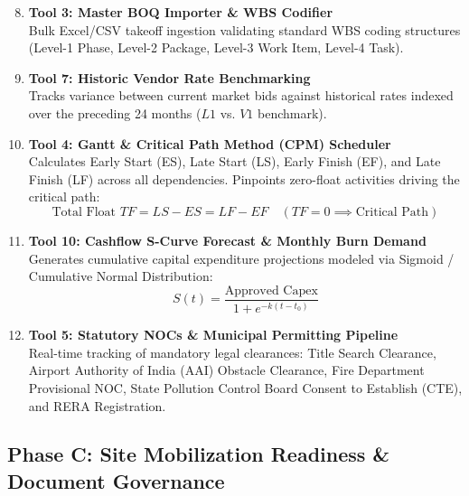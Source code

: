 \documentclass[11pt,a4paper]{article}
\begin{document}
\begin{enumerate}[leftmargin=*]
    \setcounter{enumi}{7}
    \item \textbf{Tool 3: Master BOQ Importer \& WBS Codifier} \\
    Bulk Excel/CSV takeoff ingestion validating standard WBS coding structures (Level-1 Phase, Level-2 Package, Level-3 Work Item, Level-4 Task).

    \item \textbf{Tool 7: Historic Vendor Rate Benchmarking} \\
    Tracks variance between current market bids against historical rates indexed over the preceding 24 months ($L1$ vs. $V1$ benchmark).

    \item \textbf{Tool 4: Gantt \& Critical Path Method (CPM) Scheduler} \\
    Calculates Early Start (ES), Late Start (LS), Early Finish (EF), and Late Finish (LF) across all dependencies. Pinpoints zero-float activities driving the critical path:
    \begin{equation}
        \text{Total Float } TF = LS - ES = LF - EF \quad (TF = 0 \implies \text{Critical Path})
    \end{equation}

    \item \textbf{Tool 10: Cashflow S-Curve Forecast \& Monthly Burn Demand} \\
    Generates cumulative capital expenditure projections modeled via Sigmoid / Cumulative Normal Distribution:
    \begin{equation}
        S(t) = \frac{\text{Approved Capex}}{1 + e^{-k(t - t_0)}}
    \end{equation}

    \item \textbf{Tool 5: Statutory NOCs \& Municipal Permitting Pipeline} \\
    Real-time tracking of mandatory legal clearances: Title Search Clearance, Airport Authority of India (AAI) Obstacle Clearance, Fire Department Provisional NOC, State Pollution Control Board Consent to Establish (CTE), and RERA Registration.
\end{enumerate}

\subsection{Phase C: Site Mobilization Readiness \& Document Governance}
\end{document}
